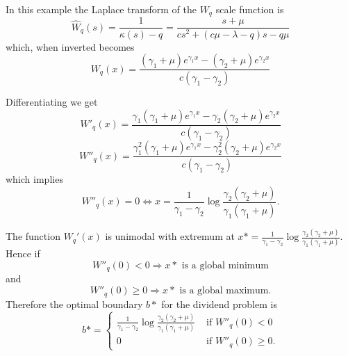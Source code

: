 In this example the Laplace transform of the $W_q$ scale function is
\[
\hat{W}_q(s) = \frac{1}{\kappa(s)-q} = \frac{s + \mu}{cs^2 + (c\mu -\lambda -q ) s -q\mu}
\]
which, when inverted becomes
\[
W_q(x) = \frac{(\gamma_1 + \mu)e^{\gamma_1 x} - (\gamma_2 + \mu) e^{\gamma_2 x} }{c(\gamma_1 - \gamma_2)}
\]

Differentiating we get
\[
W'_q(x) = \frac{\gamma_1(\gamma_1 + \mu)e^{\gamma_1 x} - \gamma_2(\gamma_2 + \mu) e^{\gamma_2 x} }{c(\gamma_1 - \gamma_2)}
\]
\[
W''_q(x) = \frac{\gamma_1^2(\gamma_1 + \mu)e^{\gamma_1 x} - \gamma_2^2(\gamma_2 + \mu) e^{\gamma_2 x} }{c(\gamma_1 - \gamma_2)}
\]
which implies
\[
W''_q(x) =0 \iff x = \frac{1}{\gamma_1 - \gamma_2} \log \frac{\gamma_2 (\gamma_2 + \mu)}{\gamma_1 (\gamma_1 + \mu)}.
\]

The function $W_q'(x)$ is unimodal with extremum at $x* = \frac{1}{\gamma_1 - \gamma_2} \log \frac{\gamma_2 (\gamma_2 + \mu)}{\gamma_1 (\gamma_1 + \mu)}$. Hence if
\[
W''_q(0)<0 \Rightarrow x* \text{ is a global minimum}
\]
and
\[
W''_q(0)\geq 0 \Rightarrow x* \text{ is a global maximum}.
\]
Therefore the optimal boundary $b*$ for the dividend problem is
\[
b*=
\begin{cases}
\frac{1}{\gamma_1 - \gamma_2} \log \frac{\gamma_2 (\gamma_2 + \mu)}{\gamma_1 (\gamma_1 + \mu)} & \text{ if } W''_q(0)<0\\
0 & \text{ if } W''_q(0)\geq 0.
\end{cases}
\]
